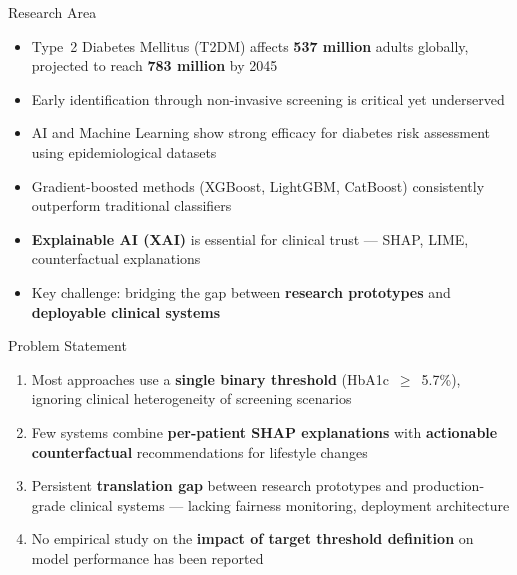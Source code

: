 \documentclass[aspectratio=169, 11pt]{beamer}
\begin{document}
\begin{frame}{Research Area}
  \small
  \begin{itemize}
    \setlength{\itemsep}{7pt}
    \item Type~2 Diabetes Mellitus (T2DM) affects \textbf{537 million} adults globally, projected to reach \textbf{783 million} by 2045
    \item Early identification through non-invasive screening is critical yet underserved
    \item AI and Machine Learning show strong efficacy for diabetes risk assessment using epidemiological datasets
    \item Gradient-boosted methods (XGBoost, LightGBM, CatBoost) consistently outperform traditional classifiers
    \item \textbf{Explainable AI (XAI)} is essential for clinical trust --- SHAP, LIME, counterfactual explanations
    \item Key challenge: bridging the gap between \textbf{research prototypes} and \textbf{deployable clinical systems}
  \end{itemize}
\end{frame}

\begin{frame}{Problem Statement}
  \small
  \begin{enumerate}
    \setlength{\itemsep}{8pt}
    \item Most approaches use a \textbf{single binary threshold} (HbA1c~$\geq$~5.7\%), ignoring clinical heterogeneity of screening scenarios
    \item Few systems combine \textbf{per-patient SHAP explanations} with \textbf{actionable counterfactual} recommendations for lifestyle changes
    \item Persistent \textbf{translation gap} between research prototypes and production-grade clinical systems --- lacking fairness monitoring, deployment architecture
    \item No empirical study on the \textbf{impact of target threshold definition} on model performance has been reported
  \end{enumerate}
\end{frame}
\end{document}
